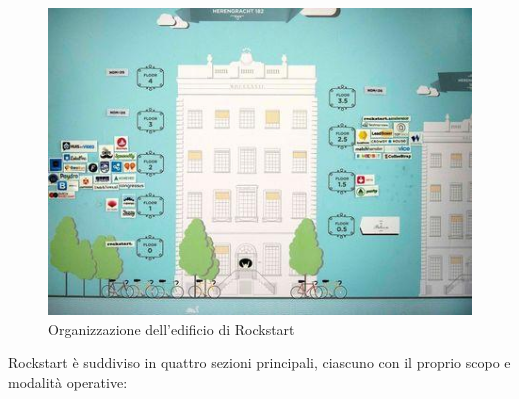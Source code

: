 \begin{figure}[htpd]
\centering
\includegraphics[width=\textwidth]{../immagini/rockstart-building}
\caption{Organizzazione dell'edificio di Rockstart}  
\end{figure}


Rockstart è suddiviso in quattro sezioni principali, ciascuno con il proprio scopo e modalità operative:

